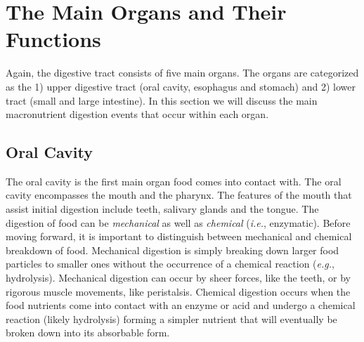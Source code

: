 \documentclass{tufte-handout}
\begin{document}
\section{The Main Organs and Their Functions}
Again, the digestive tract consists of five main organs. The organs are categorized as the 1) upper digestive tract (oral cavity, esophagus and stomach) and 2) lower tract (small and large intestine). In this section we will discuss the main macronutrient digestion events that occur within each
organ.

\subsection{Oral Cavity}
The oral cavity is the first main organ food comes into contact with. The oral cavity encompasses the mouth and the pharynx. The features of the mouth that assist initial digestion include teeth, salivary glands and the tongue. The digestion of food can be \emph{mechanical} as well as \emph{chemical} (\textit{i.e.}, enzymatic). Before moving forward, it is important to distinguish between mechanical and chemical breakdown of food. Mechanical digestion is simply breaking down larger food particles to smaller ones without the occurrence of a chemical reaction (\textit{e.g.}, hydrolysis). Mechanical digestion can occur by sheer forces, like the teeth, or by rigorous muscle movements, like peristalsis. Chemical digestion occurs when the food nutrients come into contact with an enzyme or acid and undergo a chemical reaction (likely hydrolysis) forming a simpler nutrient that will eventually be broken down into its absorbable form. 
\end{document}
